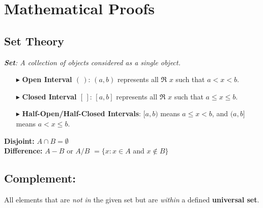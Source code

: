 \documentclass[../Main.tex]{subfiles}
\begin{document}
\chapter{Mathematical Proofs}

\section{Set Theory}
\textit{\textbf{Set}: A collection of objects considered as a single object.}\\

\begin{itemize}
    \item[$\blacktriangleright$] \textbf{Open Interval $(\, )$}: $(a, b)$ represents all $\Re$ $x$ such that $a < x < b$.
    \item[$\blacktriangleright$] \textbf{Closed Interval $[\, ]$}: $[a, b]$ represents all $\Re$ $x$ such that $a \leq x \leq b$.
    \item[$\blacktriangleright$] \textbf{Half-Open/Half-Closed Intervals}: $[a, b)$ means $a \leq x < b$, and $(a, b]$ means $a < x \leq b$.
\end{itemize}

\textbf{Disjoint:} $A \cap B = \emptyset$\\

\textbf{Difference:} $A-B$ or $A/B$ $= \{x: x\in A$ and $x \notin B \}$\\


\section*{Complement:} All elements that are \textit{not in} the given set but are \textit{within} a defined \textbf{universal set}.\\
\end{document}
